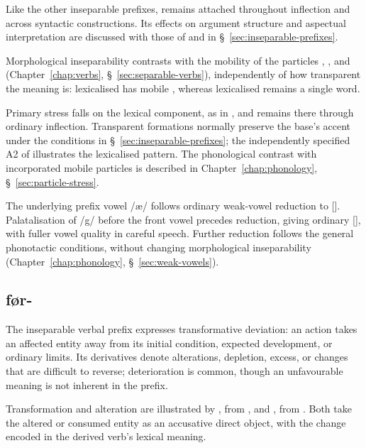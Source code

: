 Like the other inseparable prefixes,  remains attached throughout inflection and across syntactic constructions. Its effects on argument structure and aspectual interpretation are discussed with those of  and  in \S~\ref{sec:inseparable-prefixes}.

Morphological inseparability contrasts with the mobility of the particles , , and  (Chapter~\ref{chap:verbs}, \S~\ref{sec:separable-verbs}), independently of how transparent the meaning is: lexicalised  has mobile , whereas lexicalised  remains a single word.

Primary stress falls on the lexical component, as in , and remains there through ordinary inflection. Transparent formations normally preserve the base's accent under the conditions in \S~\ref{sec:inseparable-prefixes}; the independently specified A2 of  illustrates the lexicalised pattern. The phonological contrast with incorporated mobile particles is described in Chapter~\ref{chap:phonology}, \S~\ref{sec:particle-stress}.

The underlying prefix vowel /æ/ follows ordinary weak-vowel reduction to []. Palatalisation of /g/ before the front vowel precedes reduction, giving ordinary [], with fuller vowel quality in careful speech. Further reduction follows the general phonotactic conditions, without changing morphological inseparability (Chapter~\ref{chap:phonology}, \S~\ref{sec:weak-vowels}).

\subsection{før-}
\label{sec:prefix-for}

The inseparable verbal prefix  expresses transformative deviation: an action takes an affected entity away from its initial condition, expected development, or ordinary limits. Its derivatives denote alterations, depletion, excess, or changes that are difficult to reverse; deterioration is common, though an unfavourable meaning is not inherent in the prefix.

Transformation and alteration are illustrated by , from , and , from . Both take the altered or consumed entity as an accusative direct object, with the change encoded in the derived verb's lexical meaning.

